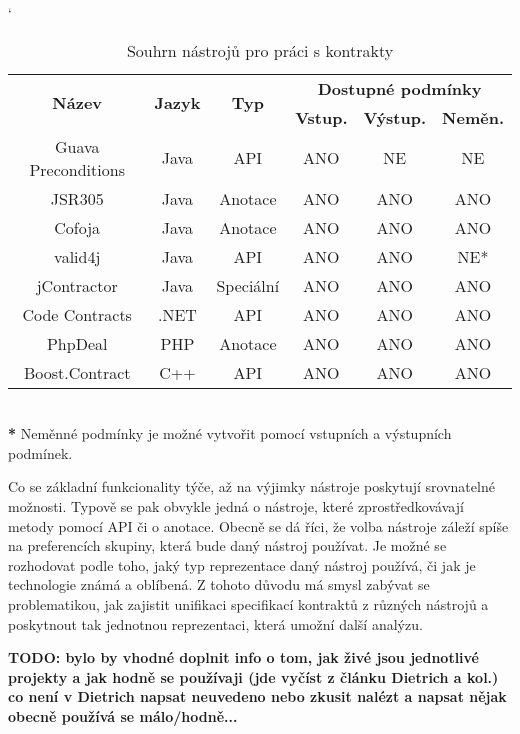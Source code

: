 		\begin{table}[H]
		\catcode`
		\begin{tabular}{|c||c|c|c|c|c|}
			\hline
			\multirow{2}{*}{\bf Název} & \multirow{2}{*}{\bf Jazyk} & \multirow{2}{*}{\bf Typ} & \multicolumn{3}{c|}{\bf Dostupné podmínky}\\
				\cline{4-6}
					& & & {\bf Vstup.} & {\bf Výstup.} & {\bf Neměn.}\\
				\hline
				\hline
					  Guava Preconditions & Java & API & ANO & NE & NE\\
					  JSR305 & Java & Anotace & ANO & ANO & ANO\\
					  Cofoja & Java & Anotace & ANO & ANO & ANO\\
					  valid4j & Java & API & ANO & ANO & NE*\\
					  jContractor & Java & Speciální & ANO & ANO & ANO\\
					  Code Contracts & .NET & API & ANO & ANO & ANO\\
					  PhpDeal & PHP & Anotace & ANO & ANO & ANO\\					  
					  Boost.Contract & C++ & API & ANO & ANO & ANO\\
				\hline
		\end{tabular}\\
		
		\footnotesize
			\- \- \- \textbf{*} Neměnné podmínky je možné vytvořit pomocí vstupních a výstupních podmínek.
					
		\caption{Souhrn nástrojů pro práci s kontrakty}
		\label{table:tabContracts}
		\end{table}		
		
		\normalsize	
			
		Co se základní funkcionality týče, až na výjimky nástroje poskytují srovnatelné možnosti. Typově se pak obvykle jedná o nástroje, které zprostředkovávají metody pomocí API či o anotace. Obecně se dá říci, že volba nástroje záleží spíše na preferencích skupiny, která bude daný nástroj používat. Je možné se rozhodovat podle toho, jaký typ reprezentace daný nástroj používá, či jak je technologie známá a oblíbená. Z tohoto důvodu má smysl zabývat se problematikou, jak zajistit unifikaci specifikací kontraktů z různých nástrojů a poskytnout tak jednotnou reprezentaci, která umožní další analýzu. 
		
		\textbf{\textcolor{pblue}{TODO: bylo by vhodné doplnit info o tom, jak živé jsou jednotlivé projekty a jak hodně se používaji (jde vyčíst z článku Dietrich a kol.) co není v Dietrich napsat neuvedeno nebo zkusit nalézt a napsat nějak obecně používá se málo/hodně...}}\\